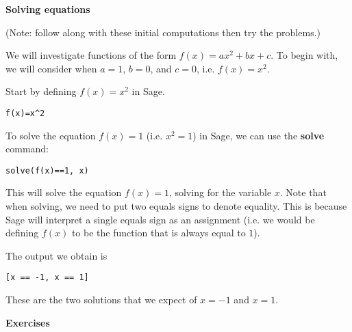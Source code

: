 {\bf \large Solving equations}

(Note: follow along with these initial computations then try the problems.)

We will investigate functions of the form $f(x)=ax^2+bx+c$. To begin
with, we will consider when $a=1$, $b=0$, and $c=0$, i.e. $f(x)=x^2$.


Start by defining $f(x)=x^2$ in Sage.

\begin{verbatim}
f(x)=x^2
\end{verbatim}

To solve the equation $f(x)=1$ (i.e. $x^2=1$) in Sage, we can use the
\textbf{solve} command:

\begin{verbatim}
solve(f(x)==1, x)
\end{verbatim}

This will solve the equation $f(x)=1$, solving for the variable $x$.
Note that when solving, we need to put two equals signs to denote
equality. This is because Sage will interpret a single equals sign
as an assignment (i.e. we would be defining $f(x)$ to be the function
that is always equal to $1$).

The output we obtain is

\begin{verbatim}
[x == -1, x == 1]
\end{verbatim}

These are the two solutions that we expect of $x=-1$ and $x=1$.

{\bf Exercises}

